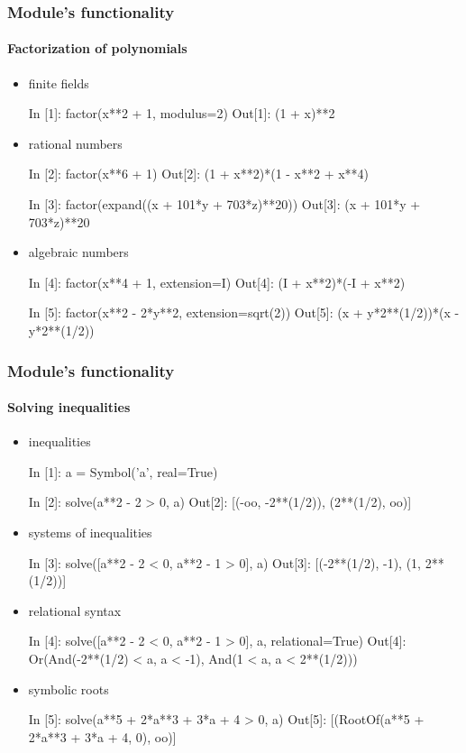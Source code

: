 \documentclass[10pt,polish]{beamer}
\begin{document}
\begin{frame}[fragile]
    \frametitle{Module's functionality}
    \framesubtitle{Factorization of polynomials}

    \begin{itemize}
        \item finite fields
            \begin{python}
In [1]: factor(x**2 + 1, modulus=2)
Out[1]: (1 + x)**2
            \end{python}
        \item rational numbers
            \begin{python}
In [2]: factor(x**6 + 1)
Out[2]: (1 + x**2)*(1 - x**2 + x**4)

In [3]: factor(expand((x + 101*y + 703*z)**20))
Out[3]: (x + 101*y + 703*z)**20
            \end{python}
        \item algebraic numbers
            \begin{python}
In [4]: factor(x**4 + 1, extension=I)
Out[4]: (I + x**2)*(-I + x**2)

In [5]: factor(x**2 - 2*y**2, extension=sqrt(2))
Out[5]: (x + y*2**(1/2))*(x - y*2**(1/2))
            \end{python}
    \end{itemize}
\end{frame}

\begin{frame}[fragile]
    \frametitle{Module's functionality}
    \framesubtitle{Solving inequalities}

    \begin{itemize}
        \item inequalities
            \begin{python}
In [1]: a = Symbol('a', real=True)

In [2]: solve(a**2 - 2 > 0, a)
Out[2]: [(-oo, -2**(1/2)), (2**(1/2), oo)]
            \end{python}
        \item systems of inequalities
            \begin{python}
In [3]: solve([a**2 - 2 < 0, a**2 - 1 > 0], a)
Out[3]: [(-2**(1/2), -1), (1, 2**(1/2))]
            \end{python}
        \item relational syntax
            \begin{python}
In [4]: solve([a**2 - 2 < 0, a**2 - 1 > 0], a, relational=True)
Out[4]: Or(And(-2**(1/2) < a, a < -1), And(1 < a, a < 2**(1/2)))
            \end{python}
        \item symbolic roots
            \begin{python}
In [5]: solve(a**5 + 2*a**3 + 3*a + 4 > 0, a)
Out[5]: [(RootOf(a**5 + 2*a**3 + 3*a + 4, 0), oo)]
            \end{python}
    \end{itemize}
\end{frame}
\end{document}
